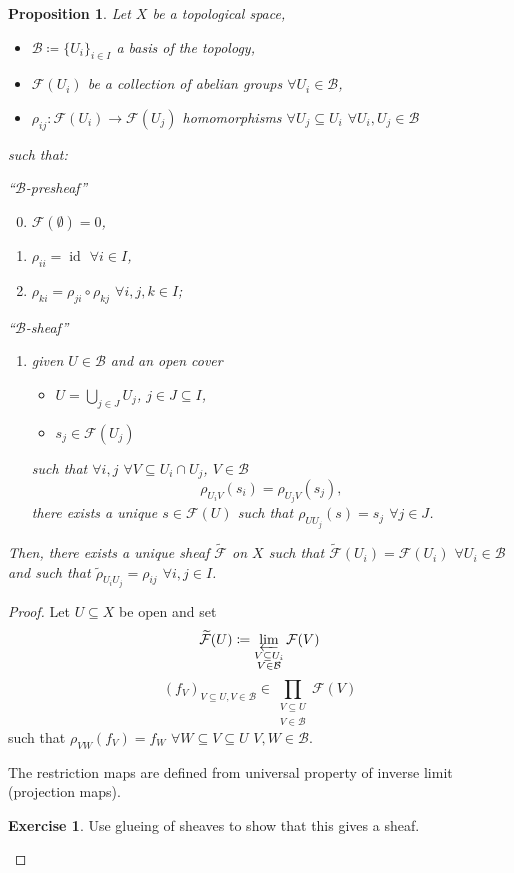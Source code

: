 \documentclass[12pt]{article}
\DeclareMathOperator{\id}{id}
\newtheorem*{proposition}{Proposition}
\theoremstyle{definition}
\newtheorem*{exercise}{Exercise}
\begin{document}
\begin{proposition}
Let $X$ be a topological space,
\begin{itemize}
\item $\mathcal B\coloneqq\{U_i\}_{i\in I}$ a basis of the topology,
\item $\mathcal F(U_i)$ be a collection of abelian groups $\forall U_i\in\mathcal B$,
\item $\rho_{ij}:\mathcal F(U_i)\rightarrow\mathcal F(U_j)$ homomorphisms $\forall U_j\subseteq U_i$ $\forall U_i,U_j\in\mathcal B$
\end{itemize}
such that:

``$\mathcal B$-presheaf''
\begin{enumerate}[label=\arabic*)]
\setcounter{enumi}{-1}
\item $\mathcal F(\emptyset)=0$,
\item $\rho_{ii}=\id$ $\forall i\in I$,
\item $\rho_{ki}=\rho_{ji}\circ\rho_{kj}$ $\forall i,j,k\in I$;
\end{enumerate}
``$\mathcal B$-sheaf''
\begin{enumerate}[label=\arabic*),resume]
\item given $U\in\mathcal B$ and an open cover
\begin{itemize}[label=$-$]
\item $U=\bigcup_{j\in J}U_j$, $j\in J\subseteq I$,
\item $s_j\in\mathcal F(U_j)$
\end{itemize}
such that $\forall i,j$ $\forall V\subseteq U_i\cap U_j$, $V\in\mathcal B$
\[\rho_{U_iV}(s_i)=\rho_{U_jV}(s_j),\]
there exists a unique $s\in\mathcal F(U)$ such that $\rho_{UU_j}(s)=s_j$ $\forall j\in J$.
\end{enumerate}

Then, there exists a unique sheaf $\widetilde{\mathcal F}$ on $X$ such that $\widetilde{\mathcal F}(U_i)=\mathcal F(U_i)$ $\forall U_i\in\mathcal B$ and such that $\widetilde\rho_{U_iU_j}=\rho_{ij}$ $\forall i,j\in I$.
\end{proposition}

\begin{proof}
Let $U\subseteq X$ be open and set
\[\widetilde{\mathcal F}(U)\coloneqq\varprojlim_{\substack{V\subseteq U_i\\V\in\mathcal B}}\mathcal F(V)\]
\[(f_V)_{V\subseteq U,V\in\mathcal B}\in\prod_{\substack{V\subseteq U\\V\in\mathcal B}}\mathcal F(V)\]
such that $\rho_{VW}(f_V)=f_W$ $\forall W\subseteq V\subseteq U$ $V,W\in\mathcal B$.

The restriction maps are defined from universal property of inverse limit (projection maps).

\begin{exercise}
Use glueing of sheaves to show that this gives a sheaf.
\end{exercise}
\end{proof}
\end{document}
